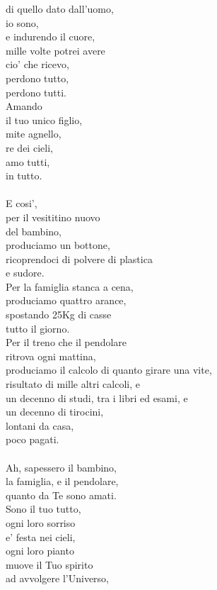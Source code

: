 \begin{haiku}
di quello dato dall'uomo,\\
io sono,\\
e indurendo il cuore,\\
mille volte potrei avere\\
cio' che ricevo,\\
perdono tutto,\\
perdono tutti.\\
Amando \\
il tuo unico figlio,\\
mite agnello,\\
re dei cieli,\\
amo tutti,\\
in tutto.\\
\leavevmode\\
E cosi',\\
per il vesititino nuovo\\
del bambino,\\
produciamo un bottone,\\
ricoprendoci di polvere di plastica\\
e sudore.\\
Per la famiglia stanca a cena,\\
produciamo quattro arance,\\
spostando 25Kg di casse\\
tutto il giorno.\\
Per il treno che il pendolare \\
ritrova ogni mattina,\\
produciamo il calcolo di quanto girare una vite,\\
risultato di mille altri calcoli, e\\
un decenno di studi, tra i libri ed esami, e\\
un decenno di tirocini,\\
lontani da casa,\\
poco pagati.\\
\leavevmode\\
Ah, sapessero il bambino,\\
la famiglia, e il pendolare,\\
quanto da Te sono amati.\\
Sono il tuo tutto,\\
ogni loro sorriso\\
e' festa nei cieli,\\
ogni loro pianto\\
muove il Tuo spirito\\
ad avvolgere l'Universo,\\

\end{haiku}
